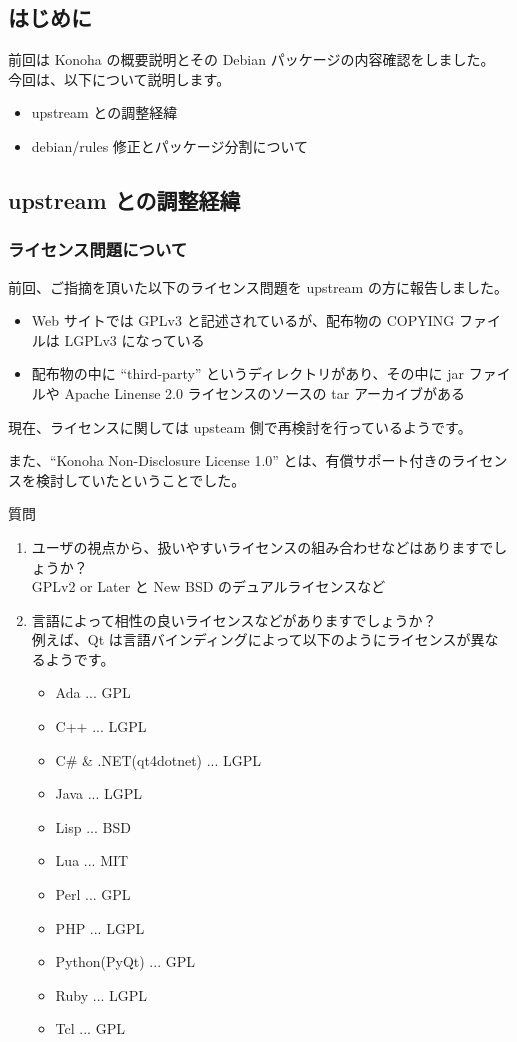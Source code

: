 \documentclass[mingoth,a4paper]{jsarticle}
\begin{document}
\subsection{はじめに}
前回は Konoha の概要説明とその Debian パッケージの内容確認をしました。
今回は、以下について説明します。
\begin{itemize}
\item upstream との調整経緯
\item debian/rules 修正とパッケージ分割について
\end{itemize}

\subsection{upstream との調整経緯}
\subsubsection{ライセンス問題について}
前回、ご指摘を頂いた以下のライセンス問題を upstream の方に報告しました。
\begin{itemize}
\item Web サイトでは GPLv3 と記述されているが、配布物の COPYING ファイルは LGPLv3 になっている
\item 配布物の中に ``third-party'' というディレクトリがあり、その中に jar ファイルや Apache Linense 2.0 ライセンスのソースの tar アーカイブがある
\end{itemize}

現在、ライセンスに関しては upsteam 側で再検討を行っているようです。

また、``Konoha Non-Disclosure License 1.0'' とは、有償サポート付きのライセンスを検討していたということでした。

\begin{itembox}[l]{質問}
  \begin{enumerate}
  \item ユーザの視点から、扱いやすいライセンスの組み合わせなどはありますでしょうか？\\
    GPLv2 or Later と New BSD のデュアルライセンスなど
  \item 言語によって相性の良いライセンスなどがありますでしょうか？\\
    例えば、Qt は言語バインディングによって以下のようにライセンスが異なるようです。
    \begin{itemize}
    \item Ada ... GPL
    \item C++ ... LGPL
    \item C\# \& .NET(qt4dotnet) ... LGPL
    \item Java ... LGPL
    \item Lisp ... BSD
    \item Lua ... MIT
    \item Perl ... GPL
    \item PHP ... LGPL
    \item Python(PyQt) ... GPL
    \item Ruby ... LGPL
    \item Tcl ... GPL
    \end{itemize}
  \end{enumerate}
\end{itembox}
\end{document}
